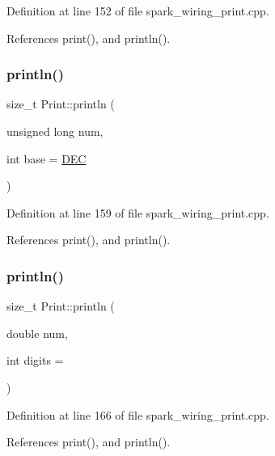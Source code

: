 Definition at line 152 of file spark\+\_\+wiring\+\_\+print.\+cpp.



References print(), and println().

\mbox{\label{class_print_aebee3c33ee5d8f10b6f378d5273742d0}} 
\subsubsection{\texorpdfstring{println()}{println()}\hspace{0.1cm}{\footnotesize\ttfamily [7/21]}}
{\footnotesize\ttfamily size\+\_\+t Print\+::println (\begin{DoxyParamCaption}\item[{unsigned long}]{num,  }\item[{int}]{base = {\ttfamily \hyperlink{docs_2src_2spark__wiring__print_8h_a26e216c38cffa0a9965fa7933ba558b1}{D\+EC}} }\end{DoxyParamCaption})}



Definition at line 159 of file spark\+\_\+wiring\+\_\+print.\+cpp.



References print(), and println().

\mbox{\label{class_print_a56e976b079361b6021ef7c2bedb397a2}} 
\subsubsection{\texorpdfstring{println()}{println()}\hspace{0.1cm}{\footnotesize\ttfamily [8/21]}}
{\footnotesize\ttfamily size\+\_\+t Print\+::println (\begin{DoxyParamCaption}\item[{double}]{num,  }\item[{int}]{digits = {} }\end{DoxyParamCaption})}



Definition at line 166 of file spark\+\_\+wiring\+\_\+print.\+cpp.



References print(), and println().

\mbox{\label{class_print_a20f9e104153b62e720c9b4c348b44f00}} 
